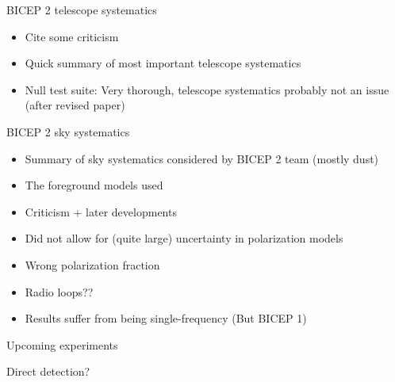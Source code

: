 \documentclass{beamer}
\begin{document}
\begin{frame}{BICEP 2 telescope systematics}
	\begin{itemize}
		\item Cite some criticism
		\item Quick summary of most important telescope systematics
		\item Null test suite: Very thorough, telescope systematics probably not an issue
			(after revised paper)
	\end{itemize}
\end{frame}

\begin{frame}{BICEP 2 sky systematics}
	\begin{itemize}
		\item Summary of sky systematics considered by BICEP 2 team (mostly dust)
		\item The foreground models used
		\item Criticism + later developments
		\item Did not allow for (quite large) uncertainty in polarization models
		\item Wrong polarization fraction
		\item Radio loops??
		\item Results suffer from being single-frequency (But BICEP 1)
	\end{itemize}
\end{frame}

\begin{frame}{Upcoming experiments}
\end{frame}

\begin{frame}{Direct detection?}
\end{frame}
\end{document}
